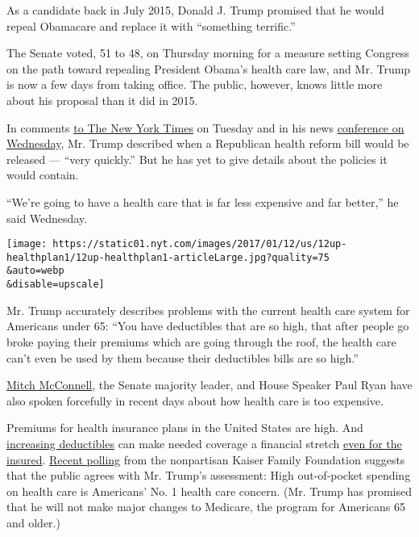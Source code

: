 As a candidate back in July 2015, Donald J. Trump promised that he would
repeal Obamacare and replace it with ``something terrific.''

The Senate voted, 51 to 48, on Thursday morning for a measure setting
Congress on the path toward repealing President Obama's health care law,
and Mr. Trump is now a few days from taking office. The public, however,
knows little more about his proposal than it did in 2015.

In comments
\href{https://www.nytimes.com/2017/01/10/us/repeal-affordable-care-act-donald-trump.html}{to
The New York Times} on Tuesday and in his news
\href{https://www.nytimes.com/2017/01/11/us/politics/trump-press-conference-transcript.html}{conference
on Wednesday}, Mr. Trump described when a Republican health reform bill
would be released --- ``very quickly.'' But he has yet to give details
about the policies it would contain.

``We're going to have a health care that is far less expensive and far
better,'' he said Wednesday.

\texttt{[image: https://static01.nyt.com/images/2017/01/12/us/12up-healthplan1/12up-healthplan1-articleLarge.jpg?quality=75\\\&auto=webp\\\&disable=upscale]}

Mr. Trump accurately describes problems with the current health care
system for Americans under 65: ``You have deductibles that are so high,
that after people go broke paying their premiums which are going through
the roof, the health care can't even be used by them because their
deductibles bills are so high.''

\href{http://www.cbsnews.com/news/face-the-nation-transcript-january-8-2017-mcconnell-priebus-booker-morell-woolsey/}{Mitch
McConnell}, the Senate majority leader, and House Speaker Paul Ryan have
also spoken forcefully in recent days about how health care is too
expensive.

Premiums for health insurance plans in the United States are high. And
\href{https://www.nytimes.com/2016/09/15/business/health-insurance-analysis-kaiser.html}{increasing
deductibles} can make needed coverage a financial stretch
\href{https://www.nytimes.com/2016/01/06/upshot/lost-jobs-houses-savings-even-insured-often-face-crushing-medical-debt.html}{even
for the insured}.
\href{http://kff.org/health-costs/poll-finding/kaiser-health-tracking-poll-health-care-priorities-for-2017/}{Recent
polling} from the nonpartisan Kaiser Family Foundation suggests that the
public agrees with Mr. Trump's assessment: High out-of-pocket spending
on health care is Americans' No. 1 health care concern. (Mr. Trump has
promised that he will not make major changes to Medicare, the program
for Americans 65 and older.)

